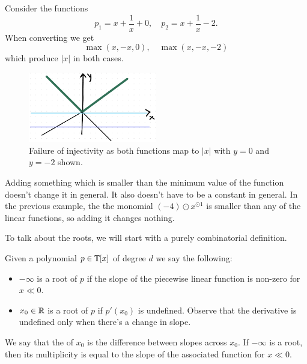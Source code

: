 \documentclass[12pt]{memoir}
\begin{document}
\begin{Ex}
    Consider the functions 
    $$p_1=x+\frac{1}{x}+0,\quad p_2=x+\frac1x-2.$$
    When converting we get 
    $$\max(x,-x,0),\quad\max(x,-x,-2)$$
    which produce $|x|$ in both cases.
    \begin{figure}[h!]
        \centering
        \includegraphics[width=0.5\textwidth]{figs/fig3-2RenzoNotes3.png}
        \caption{Failure of injectivity as both functions map to $|x|$ with $y=0$ and $y=-2$ shown.}
        \label{fig:3.2-InjectivityFailure}
    \end{figure}
    Adding something which is smaller than the minimum value of the function doesn't change it in general. It also doesn't have to be a constant in general. In the previous example, the the monomial $(-4)\odot x^{\odot 1}$ is smaller than any of the linear functions, so adding it changes nothing.
\end{Ex}

To talk about the roots, we will start with a purely combinatorial definition. 

\begin{Def}
    Given a polynomial $p\in\mathbb{T}[x]$ of degree $d$ we say the following:
    \begin{itemize}
        \item $-\infty$ is a root of $p$ if the slope of the piecewise linear function is non-zero for $x\ll 0$.
        \item $x_0\in\mathbb{R}$ is a root of $p$ if $p'(x_0)$ is undefined. Observe that the derivative is undefined only when there's a change in slope.
    \end{itemize}
    We say that the  of $x_0$ is the difference between slopes across $x_0$. If $-\infty$ is a root, then its multiplicity is equal to the slope of the associated function for $x\ll 0$.
\end{Def}
\end{document}
